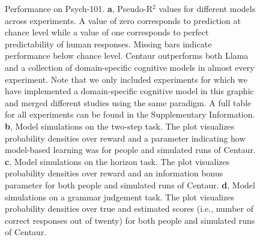 \documentclass[pdflatex,sn-nature]{sn-jnl}%
\theoremstyle{thmstyleone}%
\theoremstyle{thmstyletwo}%
\theoremstyle{thmstylethree}%
\begin{document}
\begin{figure}[!ht]
    \centering
    \caption{Performance on Psych-101. \textbf{a}, Pseudo-R$^2$ values for different models across experiments. A value of zero corresponds to prediction at chance level while a value of one corresponds to perfect predictability of human responses. Missing bars indicate performance below chance level. Centaur outperforms both Llama and a collection of domain-specific cognitive models in almost every experiment. Note that we only included experiments for which we have implemented a domain-specific cognitive model in this graphic and merged different studies using the same paradigm. A full table for all experiments can be found in the Supplementary Information. \textbf{b}, Model simulations on the two-step task. The plot visualizes probability densities over reward and a parameter indicating how model-based learning was for people and simulated runs of Centaur. \textbf{c}, Model simulations on the horizon task. The plot visualizes probability densities over reward and an information bonus parameter for both people and simulated runs of Centaur. \textbf{d}, Model simulations on a grammar judgement task. The plot visualizes probability densities over true and estimated scores (i.e., number of correct responses out of twenty) for both people and simulated runs of Centaur.}
    \label{fig:fig2}
\end{figure}
\end{document}
